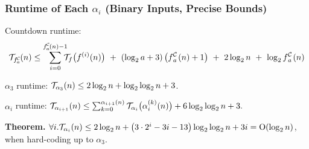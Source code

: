 \begin{frame}
\frametitle{Runtime of Each $\alpha_i$ (Binary Inputs, Precise Bounds)}

Countdown runtime:
\begin{equation*}
\runtime_{\cdt{f}{a}}(n) \le \sum_{i=0}^{\cdt{f}{a}(n) - 1} \hspace{-6pt}
\runtime_f\big(f^{(i)}(n)\big) \ + \ (\log_2a + 3)\left(\cdt{f}{a}(n) + 1\right) \ + \ 2\log_2n \ + \ \log_2\cdt{f}{a}(n)
\end{equation*}

\pause 
$\alpha_3$ runtime: $\mathcal{T}_{\alpha_3}(n) \le 2\log_2n + \log_2\log_2n + 3$.

\bigskip

\pause 
$\alpha_i$ runtime:
$
\mathcal{T}_{\alpha_{i+1}}(n) \le
\sum_{k=0}^{\alpha_{i+1}(n)}\mathcal{T}_{\alpha_i}\big(\alpha_i^{(k)}(n)\big)
+ 6\log_2\log_2n + 3.
$

\bigskip

\pause 
\textbf{Theorem.} $\forall i. \mathcal{T}_{\alpha_i}(n) \le 2\log_2n + \left(3\cdot 2^i - 3i - 13\right)\log_2\log_2n + 3i = \text{O}(\log_2n)$, when hard-coding up to $\alpha_3$.

\end{frame}



